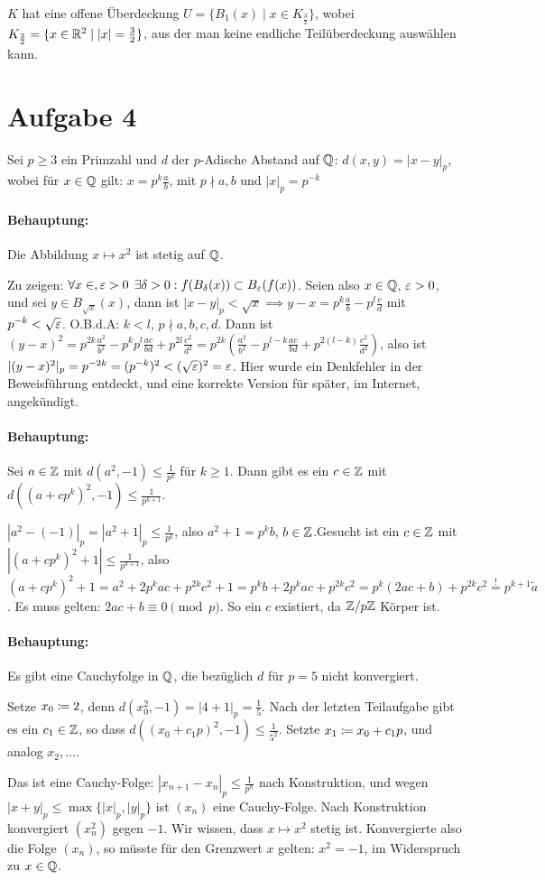 \documentclass{article}
\begin{document}
$K$ hat eine offene Überdeckung $U = \{B_{1}(x)\mid x\in K_{\frac 32}\}$, wobei $K_{\frac 32} = \{ x\in \mathbb{R}^2 \mid |x| = \frac 32 \}$, aus der man keine endliche Teilüberdeckung auswählen kann.

\section*{Aufgabe 4}

Sei $p\ge 3$ ein Primzahl und $d$ der $p$-Adische Abstand auf $\mathbb{Q}$: $d(x,y) = |x-y|_p$, wobei für $x\in \mathbb{Q}$ gilt: $x = p^{k} \frac ab$, mit $p\nmid a,b$ und $|x|_p = p^{-k}$

\paragraph{Behauptung:} Die Abbildung $x\mapsto x^2$ ist stetig auf $\mathbb{Q}$.

Zu zeigen: $\forall x\in, \varepsilon >0$ $\exists \delta > 0 : f(B_\delta(x))\subset B_\varepsilon(f(x))$. Seien also $x\in \mathbb{Q}$, $\varepsilon >0$, und sei $y\in B_{\sqrt x}(x)$, dann ist $|x-y|_p < \sqrt x \implies y-x = p^k \frac ab - p^l \frac cd$ mit $p^{-k} <\sqrt {\varepsilon}$. O.B.d.A: $k<l$, $p\nmid a,b,c,d$. Dann ist $(y-x)^2 = p^{2k} \frac {a^2}{b^2} - p^kp^l \frac{ac}{bd} + p^{2l} \frac{c^2}{d^2} = p^{2k} ( \frac {a^2}{b^2} - p^{l-k} \frac{ac}{bd} + p^{2(l-k)} \frac{c^2}{d^2})$, also ist $|(y-x)^2|_p = p^{-2k} = (p^{-k})^2 < (\sqrt{\varepsilon})^2 = \varepsilon$. Hier wurde ein Denkfehler in der Beweisführung entdeckt, und eine korrekte Version für später, im Internet, angekündigt.

\paragraph{Behauptung:} Sei $a\in \mathbb{Z}$ mit $d(a^2,-1) \le \frac 1{p^k}$ für $k\ge 1$. Dann gibt es ein $c\in \mathbb{Z}$ mit $d( (a+cp^k)^2, -1) \le \frac 1{p^{k+1}}$.

$|a^2 - (-1)|_p = |a^2 +1|_p \le \frac1{p^k}$, also $a^2 +1 = p^k b$, $b\in \mathbb{Z}$.Gesucht ist ein $c\in \mathbb{Z}$ mit $|(a + cp^k)^2+1| \le \frac1{p^{k+1}}$, also $(a + cp^k)^2 + 1 = a^2 + 2p^kac + p^{2k}c^2 + 1 = p^k b + 2p^kac + p^{2k}c^2 = p^k(2ac + b) + p^{2k}c^2 \stackrel!= p^{k+1} \tilde a$. Es muss gelten: $2ac + b \equiv 0 \pmod p$. So ein $c$ existiert, da $\mathbb{Z}/p\mathbb{Z}$ Körper ist.

\paragraph{Behauptung:} Es gibt eine Cauchyfolge in $\mathbb{Q}$, die bezüglich $d$ für $p=5$ nicht konvergiert.

Setze $x_0\da 2$, denn $d(x_0^2,-1) = |4+1|_p = \frac 15$. Nach der letzten Teilaufgabe gibt es ein $c_1\in \mathbb{Z}$, so dass $d( (x_0 + c_1p)^2, -1)\le \frac1{5^2}$. Setzte $x_1 \da x_0 + c_1p$, und analog $x_2,\ldots$.

Das ist eine Cauchy-Folge: $|x_{n+1} - x_n|_p \le \frac 1{p^n}$ nach Konstruktion, und wegen $|x+y|_p \le \max\{ |x|_p, |y|_p\}$ ist $(x_n)$ eine Cauchy-Folge. Nach Konstruktion konvergiert $(x_n^2)$ gegen $-1$. Wir wissen, dass $x\mapsto x^2$ stetig ist. Konvergierte also die Folge $(x_n)$, so müsste für den Grenzwert $x$ gelten: $x^2 = -1$, im Widerspruch zu $x\in \mathbb{Q}$.
\end{document}
